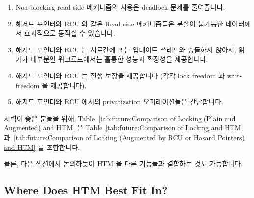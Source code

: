 \begin{enumerate}
\item	Non-blocking read-side 메커니즘의 사용은 deadlock 문제를 줄여줍니다.
\item	해저드 포인터와 RCU 와 같은 Read-side 메커니즘들은 분할이 불가능한
	데이터에서 효과적으로 동작할 수 있습니다.
\item	해저드 포인터와 RCU 는 서로간에 또는 업데이트 쓰레드와 충돌하지 않아서,
	읽기가 대부분인 워크로드에서는 훌륭한 성능과 확장성을 제공합니다.
\item	해저드 포인터와 RCU 는 진행 보장을 제공합니다 (각각 lock freedom 과
	wait-freedom 을 제공합니다).
\item	해저드 포인터와 RCU 에서의 privatization 오퍼레이션들은 간단합니다.
\iffalse

\item	Use of non-blocking read-side mechanisms alleviates deadlock issues.
\item	Read-side mechanisms such as hazard pointers and RCU can operate
	efficiently on non-partitionable data.
\item	Hazard pointers and RCU do not contend with each other or with
	updaters, allowing excellent performance and scalability for
	read-mostly workloads.
\item	Hazard pointers and RCU provide forward-progress guarantees
	(lock freedom and wait-freedom, respectively).
\item	Privatization operations for hazard pointers and RCU are
	straightforward.
\fi
\end{enumerate}



시력이 좋은 분들을 위해,
Table~\ref{tab:future:Comparison of Locking (Plain and Augmented) and HTM}
은
Table~\ref{tab:future:Comparison of Locking and HTM}
과~\ref{tab:future:Comparison of Locking (Augmented by RCU or Hazard Pointers) and HTM}
를 조합합니다.

물론, 다음 섹션에서 논의하듯이 HTM 을 다른 기능들과 결합하는 것도 가능합니다.
\iffalse

For those with good eyesight,
Table~\ref{tab:future:Comparison of Locking (Plain and Augmented) and HTM}
combines
Tables~\ref{tab:future:Comparison of Locking and HTM}
and~\ref{tab:future:Comparison of Locking (Augmented by RCU or Hazard Pointers) and HTM}.

Of course, it is also possible to augment HTM,
as discussed in the next section.
\fi

\subsection{Where Does HTM Best Fit In?}
\label{sec:future:Where Does HTM Best Fit In?}

